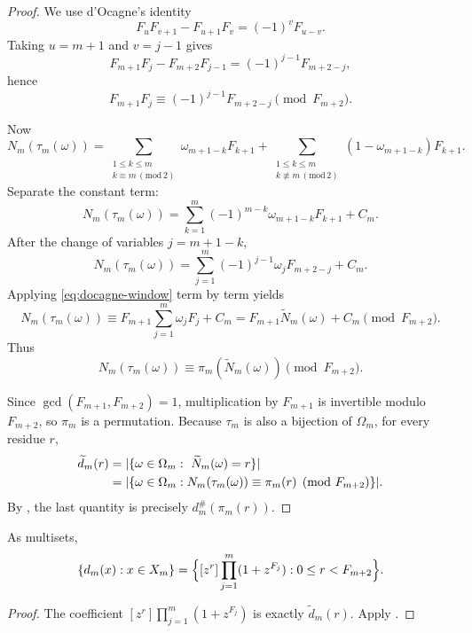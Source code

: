 \begin{proof}
We use d'Ocagne's identity
\[
  F_uF_{v+1}-F_{u+1}F_v=(-1)^vF_{u-v}.
\]
Taking \(u=m+1\) and \(v=j-1\) gives
\[
  F_{m+1}F_j-F_{m+2}F_{j-1}=(-1)^{j-1}F_{m+2-j},
\]
hence
\begin{equation}\label{eq:docagne-window}
  F_{m+1}F_j\equiv (-1)^{j-1}F_{m+2-j}\pmod{F_{m+2}}.
\end{equation}

Now
\[
  N_m(\tau_m(\omega))
  =
  \sum_{\substack{1\le k\le m\\ k\equiv m \,(\mathrm{mod}\,2)}}
  \omega_{m+1-k}F_{k+1}
  +
  \sum_{\substack{1\le k\le m\\ k\not\equiv m \,(\mathrm{mod}\,2)}}
  (1-\omega_{m+1-k})F_{k+1}.
\]
Separate the constant term:
\[
  N_m(\tau_m(\omega))
  =
  \sum_{k=1}^m(-1)^{m-k}\omega_{m+1-k}F_{k+1}+C_m.
\]
After the change of variables \(j=m+1-k\),
\[
  N_m(\tau_m(\omega))
  =
  \sum_{j=1}^m(-1)^{j-1}\omega_jF_{m+2-j}+C_m.
\]
Applying \eqref{eq:docagne-window} term by term yields
\[
  N_m(\tau_m(\omega))
  \equiv
  F_{m+1}\sum_{j=1}^m \omega_jF_j + C_m
  =
  F_{m+1}\widetilde N_m(\omega)+C_m
  \pmod{F_{m+2}}.
\]
Thus
\begin{equation}\label{eq:tau-congruence}
  N_m(\tau_m(\omega))\equiv \pi_m(\widetilde N_m(\omega))\pmod{F_{m+2}}.
\end{equation}

Since \(\gcd(F_{m+1},F_{m+2})=1\), multiplication by \(F_{m+1}\) is invertible
modulo \(F_{m+2}\), so \(\pi_m\) is a permutation.  Because \(\tau_m\) is also
a bijection of \(\Omega_m\), for every residue \(r\),
\begin{align*}
  \widetilde d_m(r)
  &=
  \lvert \{\omega\in\Omega_m:\ \widetilde N_m(\omega)=r\} \rvert \\
  &=
  \lvert 
    \left\{
      \omega\in\Omega_m:
      N_m(\tau_m(\omega))\equiv \pi_m(r)\pmod{F_{m+2}}
    \right\}
   \rvert.
\end{align*}
By , the last quantity is precisely
\(d_m^\#(\pi_m(r))\).
\end{proof}

\begin{corollary}
\label{cor:coefficient-spectrum}
As multisets,
\[
  \{d_m(x):x\in X_m\}
  =
  \Bigl\{
    [z^r]\prod_{j=1}^m(1+z^{F_j}) : 0\le r<F_{m+2}
  \Bigr\}.
\]
\end{corollary}

\begin{proof}
The coefficient \([z^r]\prod_{j=1}^m(1+z^{F_j})\) is exactly
\(\widetilde d_m(r)\).  Apply .
\end{proof}

